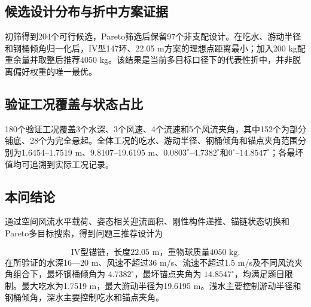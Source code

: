 \subsection{候选设计分布与折中方案证据}
初筛得到204个可行候选，Pareto筛选后保留97个非支配设计。在吃水、游动半径和钢桶倾角归一化后，IV型147环、22.05 m方案的理想点距离最小；加入200 kg配重余量并取整后推荐4050 kg。该结果是当前多目标口径下的代表性折中，并非脱离偏好权重的唯一最优。

\subsection{验证工况覆盖与状态占比}
180个验证工况覆盖3个水深、3个风速、4个流速和5个风流夹角，其中152个为部分铺底、28个为完全悬起。全体工况的吃水、游动半径、钢桶倾角和锚点夹角范围分别为1.6454--1.7519 m、9.8107--19.6195 m、$0.0803^\circ$--$4.7382^\circ$和$0^\circ$--$14.8547^\circ$；各最坏值均可追溯到实际工况记录。

\subsection{本问结论}
通过空间风流水平载荷、姿态相关迎流面积、刚性构件递推、锚链状态切换和Pareto多目标搜索，得到问题三推荐设计为

\[
\boxed{
\text{IV型锚链，长度22.05 m，重物球质量4050 kg}
}.
\]
在所验证的水深16—20 m、风速不超过36 m/s、流速不超过1.5 m/s及不同风流夹角组合下，最坏钢桶倾角为 \(4.7382^\circ\)，最坏锚点夹角为 \(14.8547^\circ\)，均满足题目限制。最大吃水为1.7519 m，最大游动半径为19.6195 m。浅水主要控制游动半径和钢桶倾角，深水主要控制吃水和锚点夹角。
